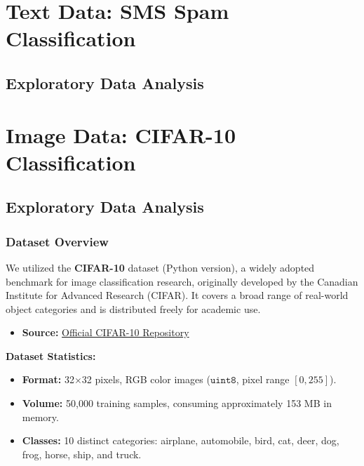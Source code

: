 \documentclass[twoside]{hcmut-report}
\begin{document}


\section{Text Data: SMS Spam Classification}
\label{sec:text}

\subsection{Exploratory Data Analysis}




\section{Image Data: CIFAR-10 Classification}
\label{sec:image}

\subsection{Exploratory Data Analysis}

\subsubsection{Dataset Overview}
We utilized the \textbf{CIFAR-10} dataset (Python version), a widely adopted benchmark
for image classification research, originally developed by the Canadian Institute for
Advanced Research (CIFAR). It covers a broad range of real-world object categories and
is distributed freely for academic use.

\begin{itemize}
    \item \textbf{Source:} \href{https://www.cs.toronto.edu/~kriz/cifar.html}{Official CIFAR-10 Repository}
\end{itemize}

\begin{importantbox}
\textbf{Dataset Statistics:}
\begin{itemize}
    \item \textbf{Format:} 32$\times$32 pixels, RGB color images ($\texttt{uint8}$, pixel range $[0, 255]$).
    \item \textbf{Volume:} 50,000 training samples, consuming approximately 153 MB in memory.
    \item \textbf{Classes:} 10 distinct categories: airplane, automobile, bird, cat, deer,
    dog, frog, horse, ship, and truck.
\end{itemize}
\end{importantbox}
\end{document}
